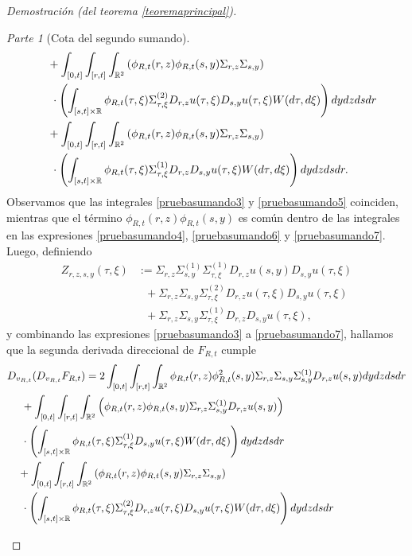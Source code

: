 \documentclass[letterpaper,twoside,12pt]{book}
\newcommand{\R}{\mathbb{R}}
\newcommand{\1}{\mathds{1}}
\theoremstyle{definition}
\theoremstyle{definition}
\theoremstyle{remark}
\newtheorem{proofpart}{Parte}
\theoremstyle{definition}
\theoremstyle{definition}
\theoremstyle{definition}
\theoremstyle{definition}
\theoremstyle{definition}
\begin{document}
\begin{proof}[Demostración (del teorema \ref{teoremaprincipal})]
\begin{proofpart}[Cota del segundo sumando]
\begin{align}
   &\ \ \ +\int_{[0,t]}\int_{[r,t]}\int_{\R^2}\left(\phi_{R,t}(r,z)\phi_{R,t}(s,y)\Sigma_{r,z}\Sigma_{s,y}\right)\notag\\
   &\ \ \ \ \cdot\left(\int_{[s,t]\times \R} \phi_{R,t}(\tau,\xi)\Sigma^{(2)}_{\tau,\xi}D_{r,z}u(\tau,\xi)D_{s,y}u(\tau,\xi)W(d\tau,d\xi)\right) dy dz ds dr\label{pruebasumando6}\\
   &\ \ \ +\int_{[0,t]}\int_{[r,t]}\int_{\R^2}\left(\phi_{R,t}(r,z)\phi_{R,t}(s,y)\Sigma_{r,z}\Sigma_{s,y}\right)\notag\\
   &\ \ \ \ \cdot\left(\int_{[s,t]\times \R}\phi_{R,t}(\tau,\xi)\Sigma^{(1)}_{\tau,\xi}D_{r,z}D_{s,y}u(\tau,\xi)W(d\tau,d\xi)\right) dy dz ds dr.\label{pruebasumando7}
\end{align}
Observamos que las integrales \eqref{pruebasumando3} y \eqref{pruebasumando5} coinciden, mientras que el término $\phi_{R,t}(r,z)\phi_{R,t}(s,y)$ es común dentro de las integrales en las expresiones \eqref{pruebasumando4}, \eqref{pruebasumando6} y \eqref{pruebasumando7}. Luego, definiendo 
\begin{align*}
   Z_{r,z,s,y}(\tau,\xi)&:=\Sigma_{r,z}\Sigma_{s,y}^{(1)}\Sigma_{\tau,\xi}^{(1)}D_{r,z}u(s,y)D_{s,y}u(\tau,\xi)\\
   &\ \ \ +\Sigma_{r,z}\Sigma_{s,y}\Sigma_{\tau,\xi}^{(2)}D_{r,z}u(\tau,\xi)D_{s,y}u(\tau,\xi)\\
   &\ \ \ +\Sigma_{r,z}\Sigma_{s,y}\Sigma_{\tau,\xi}^{(1)}D_{r,z}D_{s,y}u(\tau,\xi),
\end{align*}
y combinando las expresiones \eqref{pruebasumando3} a \eqref{pruebasumando7}, hallamos que la segunda derivada direccional de $F_{R,t}$ cumple
\begin{align}
   &D_{v_{R,t}}(D_{v_{R,t}}F_{R,t})=2\int_{[0,t]}\int_{[r,t]}\int_{\R^2}\phi_{R,t}(r,z)\phi_{R,t}^2(s,y)\Sigma_{r,z}\Sigma_{s,y}\Sigma^{(1)}_{s,y}D_{r,z}u(s,y)dy dz ds dr\notag\\
   &\ \ \ \ + \int_{[0,t]}\int_{[r,t]}\int_{\R^2}\left(\phi_{R,t}(r,z)\phi_{R,t}(s,y)\Sigma_{r,z}\Sigma_{s,y}^{(1)}D_{r,z}u(s,y)\right)\notag\\
   & \ \ \ \ \cdot \left(\int_{[s,t]\times\R}\phi_{R,t}(\tau,\xi)\Sigma_{\tau,\xi}^{(1)}D_{s,y}u(\tau,\xi)W(d\tau,d\xi)\right)dy dz ds dr\notag\\
   &\ \ \ +\int_{[0,t]}\int_{[r,t]}\int_{\R^2}\left(\phi_{R,t}(r,z)\phi_{R,t}(s,y)\Sigma_{r,z}\Sigma_{s,y}\right)\notag\\
   &\ \ \ \ \cdot \left(\int_{[s,t]\times\R}\phi_{R,t}(\tau,\xi)\Sigma_{\tau,\xi}^{(2)}D_{r,z}u(\tau,\xi)D_{s,y}u(\tau,\xi)W(d\tau,d\xi)\right)dy dz ds dr\notag\\

\end{align}
\end{proofpart}
\end{proof}
\end{document}
